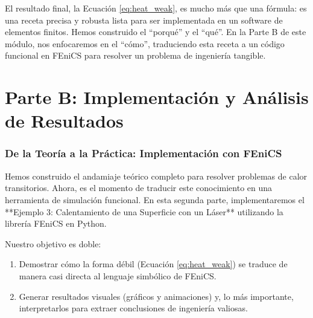 \documentclass[11pt, a4paper]{article}
\begin{document}
El resultado final, la Ecuación \ref{eq:heat_weak}, es mucho más que una fórmula: es una receta precisa y robusta lista para ser implementada en un software de elementos finitos. Hemos construido el ``porqué'' y el ``qué''. En la Parte B de este módulo, nos enfocaremos en el ``cómo'', traduciendo esta receta a un código funcional en FEniCS para resolver un problema de ingeniería tangible.

\part*{Parte B: Implementación y Análisis de Resultados}

\section{De la Teoría a la Práctica: Implementación con FEniCS}
Hemos construido el andamiaje teórico completo para resolver problemas de calor transitorios. Ahora, es el momento de traducir este conocimiento en una herramienta de simulación funcional. En esta segunda parte, implementaremos el **Ejemplo 3: Calentamiento de una Superficie con un Láser** utilizando la librería FEniCS en Python.

Nuestro objetivo es doble:
\begin{enumerate}
    \item Demostrar cómo la forma débil (Ecuación \ref{eq:heat_weak}) se traduce de manera casi directa al lenguaje simbólico de FEniCS.
    \item Generar resultados visuales (gráficos y animaciones) y, lo más importante, interpretarlos para extraer conclusiones de ingeniería valiosas.
\end{enumerate}
\end{document}
